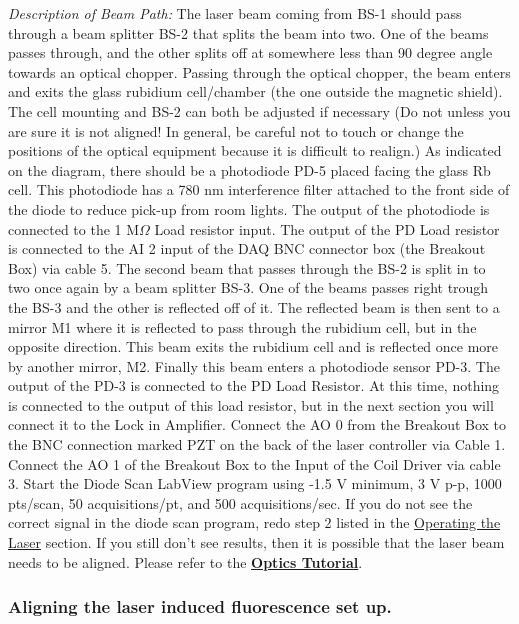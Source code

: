 \documentclass{../lab}
\begin{document}
\emph{Description of Beam Path:} The laser beam coming from BS-1 should pass through a beam splitter BS-2 that splits the beam into two. One of the beams passes through, and the other splits off at somewhere less than 90 degree angle towards an optical chopper. Passing through the optical chopper, the beam enters and exits the glass rubidium cell/chamber (the one outside the magnetic shield). The cell mounting and BS-2 can both be adjusted if necessary (Do not unless you are sure it is not aligned! In general, be careful not to touch or change the positions of the optical equipment because it is difficult to realign.) As indicated on the diagram, there should be a photodiode PD-5 placed facing the glass Rb cell. This photodiode has a 780 nm interference filter attached to the front side of the diode to reduce pick-up from room lights. The output of the photodiode is connected to the 1 M$\Omega$ Load resistor input. The output of the PD Load resistor is connected to the AI 2 input of the DAQ BNC connector box (the Breakout Box) via cable 5. The second beam that passes through the BS-2 is split in to two once again by a beam splitter BS-3. One of the beams passes right trough the BS-3 and the other is reflected off of it. The reflected beam is then sent to a mirror M1 where it is reflected to pass through the rubidium cell, but in the opposite direction. This beam exits the rubidium cell and is reflected once more by another mirror, M2. Finally this beam enters a photodiode sensor PD-3. The output of the PD-3 is connected to the PD Load Resistor. At this time, nothing is connected to the output of this load resistor, but in the next section you will connect it to the Lock in Amplifier. Connect the AO 0 from the Breakout Box to the BNC connection marked PZT on the back of the laser controller via Cable 1. Connect the AO 1 of the Breakout Box to the Input of the Coil Driver via cable 3. Start the Diode Scan LabView program using -1.5 V minimum, 3 V p-p, 1000 pts/scan, 50 acquisitions/pt, and 500 acquisitions/sec. If you do not see the correct signal in the diode scan program, redo step 2 listed in the \hyperref[subsubsec:OperatingTheLaser]{Operating the Laser} section. If you still don't see results, then it is possible that the laser beam needs to be aligned. Please refer to the \href{http://experimentationlab.berkeley.edu/OpticsTutorial}{\textbf{Optics Tutorial}}.

\subsubsection{Aligning the laser induced fluorescence set up.}
\end{document}

